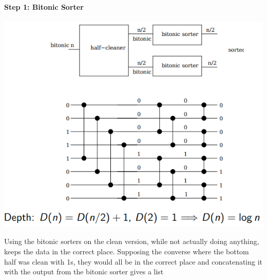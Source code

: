 \documentclass{article}[18pt]
\begin{document}
\paragraph{Step 1: Bitonic Sorter}
\begin{center}
	\includegraphics[scale=0.7]{bitonic_sorter}
\end{center}
Using the bitonic sorters on the clean version, while not actually doing anything, keeps the data in the correct place. Supposing the converse where the bottom half was clean with 1s, they would all be in the correct place and concatenating it with the output from the bitonic sorter gives a list
\end{document}
